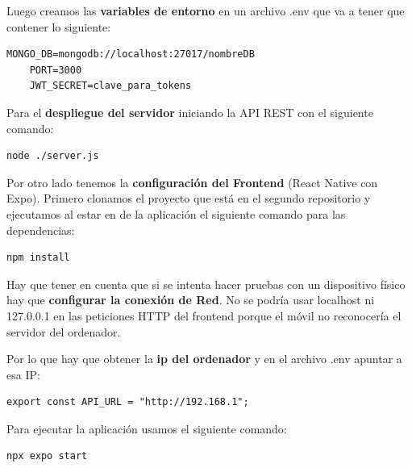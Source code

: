 \documentclass[a4paper,11pt]{article}
\begin{document}
Luego creamos las \textbf{variables de entorno} en un archivo .env que va a tener que contener lo siguiente: 

\vspace{0.5cm}

\begin{lstlisting}[style=javascript, caption={Variables de entorno necesarias para este proyecto}]
    MONGO_DB=mongodb://localhost:27017/nombreDB
    PORT=3000
    JWT_SECRET=clave_para_tokens
\end{lstlisting}

Para el \textbf{despliegue del servidor} iniciando la API REST con el siguiente comando:

\vspace{0.5cm}

\begin{lstlisting}[style=javascript, caption={Comando poara inicializar la API REST}]
   node ./server.js 
\end{lstlisting}

Por otro lado tenemos la \textbf{configuración del Frontend} (React Native con Expo). Primero clonamos el proyecto que está en el segundo repositorio y ejecutamos al estar en de la aplicación el siguiente comando para las dependencias:

\vspace{0.5cm}

\begin{lstlisting}[style=javascript, caption={Comando para instalación de dependencias}]
   npm install
\end{lstlisting}

Hay que tener en cuenta que si se intenta hacer pruebas con un dispositivo físico hay que \textbf{configurar la conexión de Red}. No se podría usar localhost ni 127.0.0.1 en las peticiones HTTP del frontend porque el móvil no reconocería el servidor del ordenador.

Por lo que hay que obtener la \textbf{ip del ordenador} y en el archivo .env apuntar a esa IP: 
\vspace{0.5cm}

\begin{lstlisting}[style=javascript, caption={Configuración para dispositvos de pruebas físicos}]
   export const API_URL = "http://192.168.1";
\end{lstlisting}

Para ejecutar la aplicación usamos el siguiente comando:
\vspace{0.5cm}

\begin{lstlisting}[style=javascript, caption={Comando de ejecución de Frontend}]
   npx expo start
\end{lstlisting}
\end{document}
